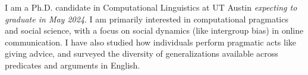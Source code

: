 I am a Ph.D. candidate in Computational Linguistics at UT Austin \emph{expecting to graduate in May 2024}. I am primarily interested in computational pragmatics and social science, with a focus on social dynamics (like intergroup bias) in online communication. I have also studied how individuals perform pragmatic acts like giving advice, and surveyed the diversity of generalizations available across predicates and arguments in English.
